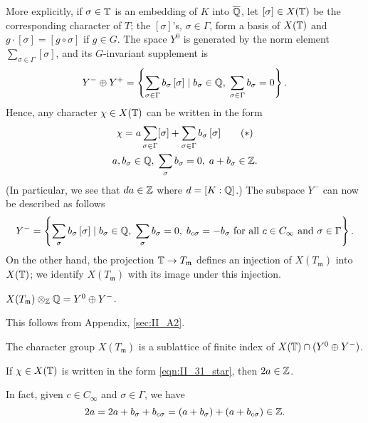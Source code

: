 More explicitly, if $\sigma \in \mathbb{T}$ is an embedding of $K$ into $\overline{\mathbb{Q}}$,
let $[\sigma] \in X(\mathbb{T})$ be the corresponding character of $T$; the
$[\sigma]$'s, $\sigma \in \Gamma$, form a basis of $X(\mathbb{T})$ and $g\cdot[\sigma]
= [g\circ\sigma]$ if $g \in G$. The space $Y^0$ is generated by the norm
element $\sum_{\sigma \in \Gamma} [\sigma]$, and its $G$-invariant supplement
is
\[
	Y^- \oplus Y^+ = \left\{ \sum_{\sigma \in \Gamma} b_\sigma \, [\sigma]
	\mid b_\sigma \in \mathbb{Q}, \; \sum_{\sigma \in \Gamma} b_\sigma = 0 \right\}.
\]
Hence, any character $\chi \in X(\mathbb{T})$ can be written in the form
\begin{gather}
	\chi = a \sum_{\sigma\in \Gamma} [\sigma] + \sum_{\sigma \in \Gamma}
	b_\sigma \, [\sigma] \tag{$*$}\label{eqn:II_31_star} \\
	a, b_\sigma \in \mathbb{Q}, \; \sum_{\sigma} b_\sigma = 0, \; a + b_\sigma \in
	\mathbb{Z}. \notag
\end{gather}
(In particular, we see that $da \in \mathbb{Z}$ where $d = [K : \mathbb{Q}]$.) The subspace
$Y^-$ can now be described as follows
\[
	Y^- = \left\{ \sum_{\sigma} b_\sigma \, [\sigma] \mid b_\sigma \in \mathbb{Q}, \;
	\sum_{\sigma} b_\sigma = 0, \; b_{c\sigma} = -b_\sigma \text{ for all }
	c \in C_\infty \text{ and } \sigma \in \Gamma \right\}.
\]
On the other hand, the projection $\mathbb{T} \to T_{\mathfrak{m}}$ defines an
injection of $X(T_{\mathfrak{m}})$ into $X(\mathbb{T})$; we identify
$X(T_{\mathfrak{m}})$ with its image under this injection.

\begin{prop}
	$X(T_{\mathfrak{m}}) \otimes_{\mathbb{Z}} \mathbb{Q} = Y^0 \oplus Y^-$.
\end{prop}
This follows from Appendix, \ref{sec:II_A2}.

\begin{corp}
	\dpage
	The character group $X(T_{\mathfrak{m}})$ is a sublattice of finite
	index of $X(\mathbb{T}) \cap (Y^0 \oplus Y^-)$.
\end{corp}
\begin{corp}
	If $\chi \in X(\mathbb{T})$ is written in the form \eqref{eqn:II_31_star},
	then $2a \in \mathbb{Z}$.
\end{corp}
In fact, given $c \in C_\infty$ and $\sigma \in \Gamma$, we have
\[
	2a = 2a + b_\sigma + b_{c\sigma} = (a+b_\sigma) + (a+b_{c\sigma}) \in
	\mathbb{Z}.
\]

